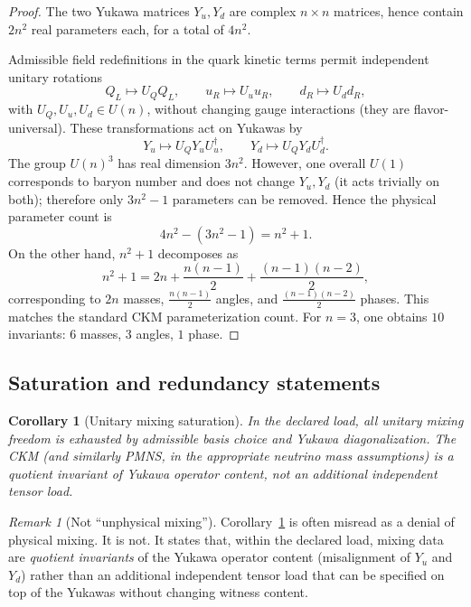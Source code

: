 \documentclass[11pt]{article}
\newtheorem{corollary}[definition]{Corollary}
\theoremstyle{remark}
\newtheorem{remark}[definition]{Remark}
\begin{document}
\begin{proof}
The two Yukawa matrices $Y_u,Y_d$ are complex $n\times n$ matrices, hence contain $2n^2$ real parameters each,
for a total of $4n^2$.

Admissible field redefinitions in the quark kinetic terms permit independent unitary rotations
\begin{equation}
Q_L\mapsto U_Q Q_L,\qquad u_R\mapsto U_u u_R,\qquad d_R\mapsto U_d d_R,
\end{equation}
with $U_Q,U_u,U_d\in U(n)$, without changing gauge interactions (they are flavor-universal).
These transformations act on Yukawas by
\begin{equation}
Y_u\mapsto U_Q Y_u U_u^\dagger,\qquad
Y_d\mapsto U_Q Y_d U_d^\dagger.
\end{equation}
The group $U(n)^3$ has real dimension $3n^2$. However, one overall $U(1)$ corresponds to baryon number and
does not change $Y_u,Y_d$ (it acts trivially on both); therefore only $3n^2-1$ parameters can be removed.
Hence the physical parameter count is
\begin{equation}
4n^2-(3n^2-1)=n^2+1.
\end{equation}
On the other hand, $n^2+1$ decomposes as
\begin{equation}
n^2+1 = 2n + \frac{n(n-1)}{2} + \frac{(n-1)(n-2)}{2},
\end{equation}
corresponding to $2n$ masses, $\frac{n(n-1)}{2}$ angles, and $\frac{(n-1)(n-2)}{2}$ phases. This matches
the standard CKM parameterization count. For $n=3$, one obtains $10$ invariants: $6$ masses, $3$ angles, $1$
phase.
\end{proof}

\subsection{Saturation and redundancy statements}

\begin{corollary}[Unitary mixing saturation]\label{cor:mixing-saturation}
In the declared load, all unitary mixing freedom is exhausted by admissible basis choice and Yukawa
diagonalization. The CKM (and similarly PMNS, in the appropriate neutrino mass assumptions) is a
\emph{quotient invariant} of Yukawa operator content, not an additional independent tensor load.
\end{corollary}

\begin{remark}[Not ``unphysical mixing'']\label{rem:not-unphysical-mixing}
Corollary~\ref{cor:mixing-saturation} is often misread as a denial of physical mixing.
It is not. It states that, within the declared load, mixing data are \emph{quotient invariants} of the
Yukawa operator content (misalignment of $Y_u$ and $Y_d$) rather than an additional independent tensor
load that can be specified on top of the Yukawas without changing witness content.
\end{remark}
\end{document}
